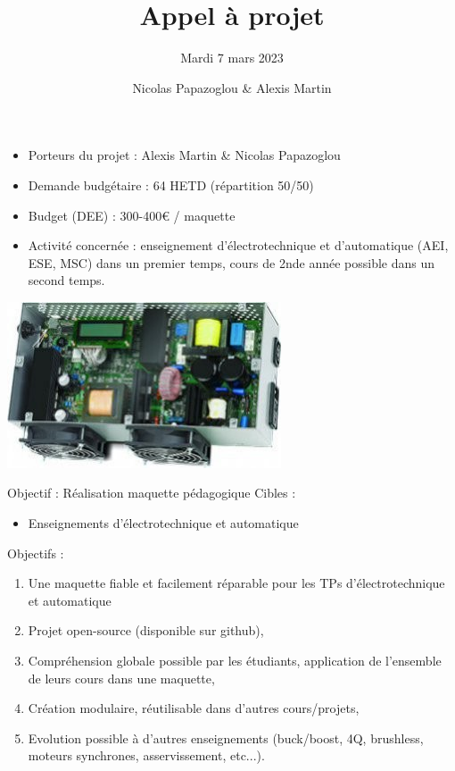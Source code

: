 \documentclass[aspectratio=169]{beamer}
\title{Appel à projet}
\subtitle{Mardi 7 mars 2023}
\date{}
\author[PAPAZOGLOU - MARTIN]{Nicolas Papazoglou \& Alexis Martin}
\institute[ENSEA]{ENSEA}
\begin{document}
\begin{frame}
	\titlepage
\end{frame}

\begin{frame}
\begin{minipage}{0.49\textwidth}
	\begin{itemize}
		\item Porteurs du projet : Alexis Martin \& Nicolas Papazoglou
		\item Demande budgétaire : 64 HETD (répartition 50/50)
		\item Budget (DEE) : 300-400€ / maquette
		\item Activité concernée : enseignement d'électrotechnique et d'automatique (AEI, ESE, MSC) dans un premier temps, cours de 2nde année possible dans un second temps.
	\end{itemize}
\end{minipage}
\begin{minipage}{0.49\textwidth}
	\includegraphics[scale=0.6]{inverter.jpeg} 
\end{minipage}

\end{frame}
\begin{frame}{Objectif : Réalisation maquette pédagogique}
	Cibles : 
	\begin{itemize}
		\item Enseignements d'électrotechnique et automatique
	\end{itemize}
	Objectifs : 
	\begin{enumerate}
		\item Une maquette fiable et facilement réparable pour les TPs d'électrotechnique et automatique
		\item Projet open-source (disponible sur github),
		\item Compréhension globale possible par les étudiants, application de l'ensemble de leurs cours dans une maquette,
		\item Création modulaire, réutilisable dans d'autres cours/projets, 
		\item Evolution possible à d'autres enseignements (buck/boost, 4Q, brushless, moteurs synchrones, asservissement, etc...).
	\end{enumerate}
\end{frame}
\end{document}

